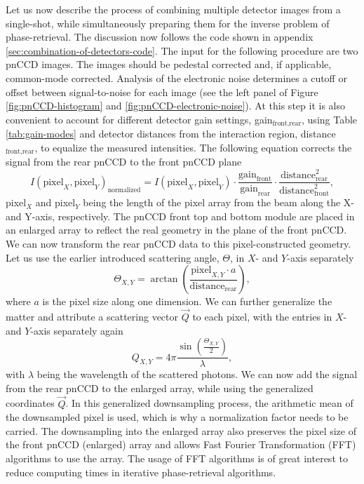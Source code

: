 Let us now describe the process of combining multiple detector images from a single-shot, while simultaneously preparing them for the inverse problem of phase-retrieval. The discussion now follows the code shown in appendix \ref{sec:combination-of-detectors-code}. The input for the following procedure are two pnCCD images. The images should be pedestal corrected and, if applicable, common-mode corrected. Analysis of the electronic noise determines a cutoff or offset between signal-to-noise for each image (see the left panel of Figure \ref{fig:pnCCD-histogram} and \ref{fig:pnCCD-electronic-noise}). At this step it is also convenient to account for different detector gain settings, gain$_{\text{front,rear}}$, using Table \ref{tab:gain-modes} and detector distances from the interaction region, distance$_{\text{front,rear}}$, to equalize the measured intensities. The following equation corrects the signal from the rear pnCCD to the front pnCCD plane
\begin{equation}
I(\text{pixel}_{X},\text{pixel}_{Y})_{\text{normalized}} = I(\text{pixel}_{X},\text{pixel}_{Y})\cdot \frac{\text{gain}_{\text{front}}}{\text{gain}_{\text{rear}}} \cdot \frac{\text{distance}_{\text{rear}}^{2}}{\text{distance}_{\text{front}}^{2}},
\end{equation}
pixel$_{X}$ and pixel$_{Y}$ being the length of the pixel array from the beam along the X- and Y-axis, respectively. The pnCCD front top and bottom module are placed in an enlarged array to reflect the real geometry in the plane of the front pnCCD. We can now transform the rear pnCCD data to this pixel-constructed geometry. Let us use the earlier introduced scattering angle, $\Theta$, in $X$- and $Y$-axis separately
\begin{equation}
\Theta_{X,Y} = \arctan\left(\frac{\text{pixel}_{X,Y} \cdot a}{\text{distance}_{\text{rear}}}\right),
\label{eqn:scattering-angle}
\end{equation}
where $a$ is the pixel size along one dimension. We can further generalize the matter and attribute a scattering vector $\vec{Q}$ to each pixel, with the entries in $X$- and $Y$-axis separately again
\begin{equation}
Q_{X,Y} = 4 \pi \frac{\sin\left(\frac{\Theta_{X,Y}}{2}\right)}{\lambda},
\label{eqn:q-vector}
\end{equation}
with $\lambda$ being the wavelength of the scattered photons. We can now add the signal from the rear pnCCD to the enlarged array, while using the generalized coordinates $\vec{Q}$. In this generalized downsampling process, the arithmetic mean of the downsampled pixel is used, which is why a normalization factor needs to be carried. The downsampling into the enlarged array also  preserves the pixel size of the front pnCCD (enlarged) array and allows Fast Fourier Transformation (FFT) algorithms to use the array. The usage of FFT algorithms is of great interest to reduce computing times in iterative phase-retrieval algorithms.\\[1\baselineskip]
